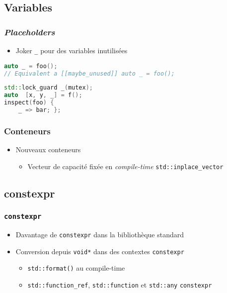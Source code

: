 \documentclass[C++.tex]{subfiles}
\begin{document}
\subsection*{Variables}
\begin{frame}[fragile]
	\frametitle{\textit{Placeholders}}
	\begin{itemize}
		\item Joker \lstinline|_| pour des variables inutilisées
	\end{itemize}
	
	\begin{lstlisting}[language=C++]
auto _ = foo();
// Equivalent a [[maybe_unused]] auto _ = foo();\end{lstlisting}

	\begin{lstlisting}[language=C++]
std::lock_guard _(mutex);
auto  [x, y, _] = f();
inspect(foo) { 
	_ => bar; };\end{lstlisting}
\end{frame}

\begin{frame}[fragile]
	\frametitle{Conteneurs}
	\begin{itemize}
		\item Nouveaux conteneurs
		\begin{itemize}
			\item Vecteur de capacité fixée en \textit{compile-time} \lstinline|std::inplace_vector|

		\end{itemize}
	\end{itemize}
\end{frame}

\subsection*{constexpr}
\begin{frame}[fragile]
	\frametitle{\lstinline|constexpr|}
	\begin{itemize}
		\item Davantage de \lstinline|constexpr| dans la bibliothèque standard
		\item Conversion depuis \lstinline|void*| dans des contextes \lstinline|constexpr|
		\begin{itemize}
			\item \lstinline|std::format()| au compile-time
			\item \lstinline|std::function_ref|, \lstinline|std::function| et \lstinline|std::any| \lstinline|constexpr|
		\end{itemize}
	\end{itemize}
\end{frame}
\end{document}
